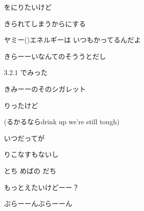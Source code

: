 \documentclass[a4paper,tate,twocolumn,12pt]{ltjtarticle}
\begin{document}
\begin{flushleft}
\begin{minipage}{\linewidth}
をにりたいけど

きられてしまうからにする

ヤミー()エネルギーは いつもかってるんだよ
\end{minipage}

\vspace{2em}

\noindent\begin{minipage}{\linewidth}
\end{minipage}

\vspace{2em}

\noindent\begin{minipage}{\linewidth}
きらーーいなんてのそううとだし

3.2.1 でみった

きみーーのそのシガレット

りったけど

(るかるならdrink up we're still tough)

いつだってが

りこなすもないし

とち めばの だち

もっとえたいけどーー？

ぶらーーんぶらーーん
\end{minipage}

\end{flushleft}
\end{document}
